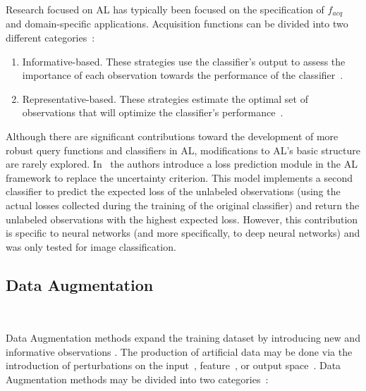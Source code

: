 \documentclass[10pt,journal,compsoc]{IEEEtran}
\begin{document}
Research focused on AL has typically been focused on the specification of
$f_{acq}$~\cite{hospedales2011finding} and domain-specific applications.
Acquisition functions can be divided into two different
categories~\cite{Gu2021, Kumar2020}: 

\begin{enumerate}

    \item Informative-based. These strategies use the classifier's output to
        assess the importance of each observation towards the performance of
        the classifier~\cite{Fu2013}.

    \item Representative-based. These strategies estimate the optimal set of
        observations that will optimize the classifier's
        performance~\cite{Kumar2020}.

\end{enumerate}

Although there are significant contributions toward the development of more
robust query functions and classifiers in AL, modifications to AL's basic
structure are rarely explored. In~\cite{Yoo2019} the authors introduce a loss
prediction module in the AL framework to replace the uncertainty criterion.
This model implements a second classifier to predict the expected loss of the
unlabeled observations (using the actual losses collected during the training
of the original classifier) and return the unlabeled observations with the
highest expected loss. However, this contribution is specific to neural
networks (and more specifically, to deep neural networks) and was only tested
for image classification.

\subsection{Data Augmentation}~\label{sec:data_augmentation}

Data Augmentation methods expand the training dataset by introducing new and
informative observations \cite{Behpour2019}. The production of artificial data
may be done via the introduction of perturbations on the
input~\cite{fonseca2021improving}, feature~\cite{DeVries2017}, or output
space~\cite{Behpour2019}. Data Augmentation methods may be divided into two
categories~\cite{Shorten2019}:
\end{document}
